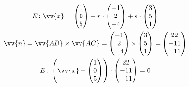 \begin{gather*}
  E \colon \vv{x} = \begin{pmatrix}1 \\ 0 \\ 5\end{pmatrix} + r \cdot \begin{pmatrix}-1 \\ 2 \\ -4\end{pmatrix} + s \cdot \begin{pmatrix}3 \\ 5 \\ 1\end{pmatrix} \\
  \vv{n} = \vv{AB} \times \vv{AC} = \begin{pmatrix}-1 \\ 2 \\ -4\end{pmatrix} \times \begin{pmatrix}3 \\ 5 \\ 1\end{pmatrix} = \begin{pmatrix}22 \\ -11 \\ -11\end{pmatrix} \\
  E \colon \left(\vv{x} - \begin{pmatrix}1 \\ 0 \\ 5\end{pmatrix}  \right) \cdot \begin{pmatrix}22 \\ -11 \\ -11\end{pmatrix} = 0
\end{gather*}
